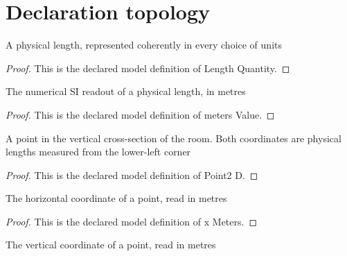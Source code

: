 \section{Declaration topology}
\begin{definition}
  \label{def:physics:phyx-mini-0063:phyxminiproblems-problemphyxmini0063-lengthquantity}
  A physical length, represented coherently in every choice of units
\end{definition}
\begin{proof}
  This is the declared model definition of Length Quantity.
\end{proof}
\begin{definition}
  \label{def:physics:phyx-mini-0063:phyxminiproblems-problemphyxmini0063-metersvalue}
  The numerical SI readout of a physical length, in metres
\end{definition}
\begin{proof}
  This is the declared model definition of meters Value.
\end{proof}
\begin{definition}[Point2 D]
  \label{def:physics:phyx-mini-0063:phyxminiproblems-problemphyxmini0063-point2d}
  A point in the vertical cross-section of the room. Both coordinates are physical lengths measured from the lower-left corner
\end{definition}
\begin{proof}
  This is the declared model definition of Point2 D.
\end{proof}
\begin{definition}[x Meters]
  \label{def:physics:phyx-mini-0063:phyxminiproblems-problemphyxmini0063-point2d-xmeters}
  The horizontal coordinate of a point, read in metres
\end{definition}
\begin{proof}
  This is the declared model definition of x Meters.
\end{proof}
\begin{definition}[y Meters]
  \label{def:physics:phyx-mini-0063:phyxminiproblems-problemphyxmini0063-point2d-ymeters}
  The vertical coordinate of a point, read in metres
\end{definition}

